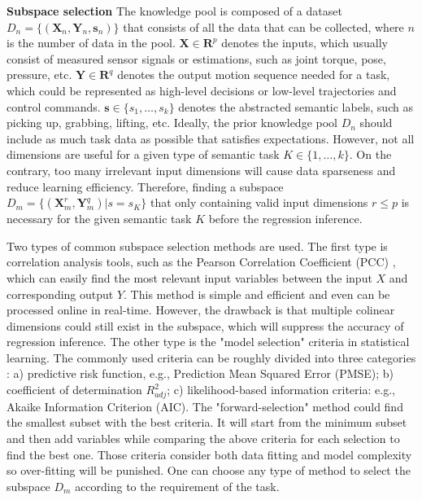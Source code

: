 \documentclass[conference]{IEEEtran}
\begin{document}
\textbf{Subspace selection} The knowledge pool is composed of a dataset $D_n=\{ (\mathbf{X}_n, \mathbf{Y}_n, \mathbf{s}_n) \}$ that consists of all the data that can be collected, where $n$ is the number of data in the pool. $\mathbf{X}\in \mathbf{R}^p$ denotes the inputs, which usually consist of measured sensor signals or estimations, such as joint torque, pose, pressure, etc. $\mathbf{Y}\in \mathbf{R}^q$ denotes the output motion sequence needed for a task, which could be represented as high-level decisions or low-level trajectories and control commands. $\mathbf{s} \in \{ s_1, \ldots, s_k \}$ denotes the abstracted semantic labels, such as picking up, grabbing, lifting, etc. Ideally, the prior knowledge pool $D_n$ should include as much task data as possible that satisfies expectations.
However, not all dimensions are useful for a given type of semantic task $K \in \{1, \ldots, k\}$. On the contrary, too many irrelevant input dimensions will cause data sparseness and reduce learning efficiency. Therefore, finding a subspace $D_m=\{ (\mathbf{X}_m^r, \mathbf{Y}_m^q) | s = s_K \}$ that only containing valid input dimensions $r \leq p$ is necessary for the given semantic task $K$ before the regression inference.

Two types of common subspace selection methods are used. The first type is correlation analysis tools, such as the Pearson Correlation Coefficient (PCC) \cite{4389268}, which can easily find the most relevant input variables between the input $X$ and corresponding output $Y$. This method is simple and efficient and even can be processed online in real-time. However, the drawback is that multiple colinear dimensions could still exist in the subspace, which will suppress the accuracy of regression inference. The other type is the "model selection" criteria in statistical learning. The commonly used criteria can be roughly divided into three categories \cite{james2013introduction}: a) predictive risk function, e.g., Prediction Mean Squared Error (PMSE); b) coefficient of determination $R_{adj}^2$; c) likelihood-based information criteria: e.g., Akaike Information Criterion (AIC). The "forward-selection" method could find the smallest subset with the best criteria. 
It will start from the minimum subset and then add variables while comparing the above criteria for each selection to find the best one. Those criteria consider both data fitting and model complexity so over-fitting will be punished. 
One can choose any type of method to select the subspace $D_m$ according to the requirement of the task.
\end{document}
